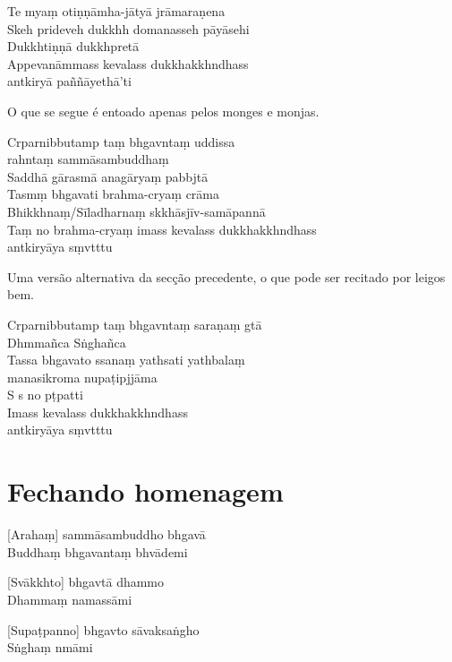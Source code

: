 Te myaṃ otiṇṇāmha-jātyā jrāmaraṇena\\
Skeh prideveh dukkhh domanasseh pāyāsehi\\
Dukkhtiṇṇā dukkhpretā\\
Appevanāmmass kevalass dukkhakkhndhass\\
\vin antkiryā paññāyethā'ti

\begin{instruction}
  O que se segue é entoado apenas pelos monges e monjas.
\end{instruction}

Crparnibbutamp taṃ bhgavntaṃ uddissa\\
\vin {}rahntaṃ sammāsambuddhaṃ\\
Saddhā gārasmā anagāryaṃ pabbjtā\\
Tasmṃ bhgavati brahma-cryaṃ crāma\\
Bhikkhnaṃ/Sīladharnaṃ skkhāsjīv-samāpannā\\
Taṃ no brahma-cryaṃ imass kevalass dukkhakkhndhass\\
\vin antkiryāya sṃvtttu

\clearpage

\begin{instruction}
  Uma versão alternativa da secção precedente, o que pode ser recitado por leigos bem.
\end{instruction}

Crparnibbutamp taṃ bhgavntaṃ saraṇaṃ gtā\\
Dhmmañca Sṅghañca\\
Tassa bhgavato ssanaṃ yathsati yathbalaṃ\\
\vin manasikroma nupaṭipjjāma\\
S s no pṭpatti\\
Imass kevalass dukkhakkhndhass\\
\vin antkiryāya sṃvtttu

\chapter{Fechando homenagem}       %

[Arahaṃ] sammāsambuddho bhgavā\\
Buddhaṃ bhgavantaṃ bhvādemi 

[Svākkhto] bhgavtā dhammo\\
Dhammaṃ namassāmi 

[Supaṭpanno] bhgavto sāvaksaṅgho\\
Sṅghaṃ nmāmi 


